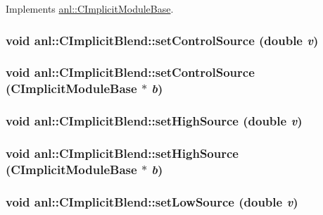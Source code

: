 Implements \hyperlink{classanl_1_1CImplicitModuleBase_ab88f8a1822dcfbc13ba5230318b0acd1}{anl::CImplicitModuleBase}.\hypertarget{classanl_1_1CImplicitBlend_a8839f537a0b91cfa83b7860da4184ea2}{
\subsubsection[{setControlSource}]{\setlength{\rightskip}{0pt plus 5cm}void anl::CImplicitBlend::setControlSource (double {\em v})}}
\label{classanl_1_1CImplicitBlend_a8839f537a0b91cfa83b7860da4184ea2}
\hypertarget{classanl_1_1CImplicitBlend_a398b48040362178032cc32d08f43a7f2}{
\subsubsection[{setControlSource}]{\setlength{\rightskip}{0pt plus 5cm}void anl::CImplicitBlend::setControlSource ({\bf CImplicitModuleBase} $\ast$ {\em b})}}
\label{classanl_1_1CImplicitBlend_a398b48040362178032cc32d08f43a7f2}
\hypertarget{classanl_1_1CImplicitBlend_addfd0053647b22d2b8c7c1599e46fadf}{
\subsubsection[{setHighSource}]{\setlength{\rightskip}{0pt plus 5cm}void anl::CImplicitBlend::setHighSource (double {\em v})}}
\label{classanl_1_1CImplicitBlend_addfd0053647b22d2b8c7c1599e46fadf}
\hypertarget{classanl_1_1CImplicitBlend_a258367726a0178a5a5c081cfa8523426}{
\subsubsection[{setHighSource}]{\setlength{\rightskip}{0pt plus 5cm}void anl::CImplicitBlend::setHighSource ({\bf CImplicitModuleBase} $\ast$ {\em b})}}
\label{classanl_1_1CImplicitBlend_a258367726a0178a5a5c081cfa8523426}
\hypertarget{classanl_1_1CImplicitBlend_a683d50ea2c9852cab8737158e22a478b}{
\subsubsection[{setLowSource}]{\setlength{\rightskip}{0pt plus 5cm}void anl::CImplicitBlend::setLowSource (double {\em v})}}
